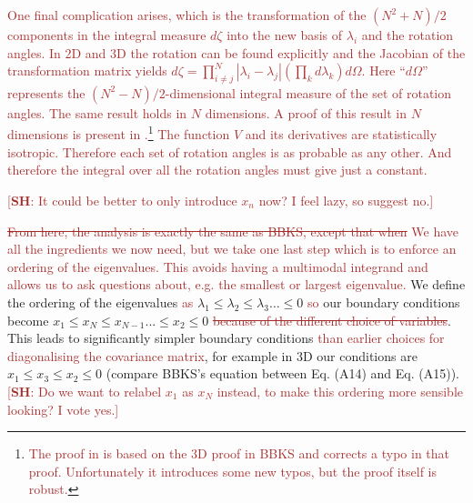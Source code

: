 \documentclass[12pt]{article}
\newcommand{\SH}[1]{\textcolor{brown}{[{\bf SH}: #1]}}
\newcommand{\sh}[1]{\textcolor{brown}{#1}}
\begin{document}
\sh{One final complication arises, which is the transformation of the $(N^2+N)/2$ components in the integral measure $d\zeta$ into the new basis of $\lambda_i$ and the rotation angles. In 2D and 3D the rotation can be found explicitly and the Jacobian of the transformation matrix yields $d \zeta = \prod_{i \neq j}^N |\lambda_i - \lambda_j|(\prod_k d\lambda_k) d \Omega$. Here ``$d\Omega$'' represents the $(N^2-N)/2$-dimensional integral measure of the set of rotation angles. The same result holds in $N$ dimensions. A proof of this result in $N$ dimensions is present in \cite{Easther2016}.\footnote{\sh{The proof in \cite{Easther2016} is based on the 3D proof in BBKS and corrects a typo in that proof. Unfortunately it introduces some new typos, but the proof itself is robust.}} The function $V$ and its derivatives are statistically isotropic. Therefore each set of rotation angles is as probable as any other. And therefore the integral over all the rotation angles must give just a constant.}





\SH{It could be better to only introduce $x_n$ now? I feel lazy, so suggest no.}

\sh{\sout{From here, the analysis is exactly the same as BBKS, except that when} We have all the ingredients we now need, but we take one last step which is to enforce an ordering of the eigenvalues. This avoids having a multimodal integrand and allows us to ask questions about, e.g. the smallest or largest eigenvalue.} We define the ordering of the eigenvalues \sh{as} $\lambda_1 \leq \lambda_2 \leq \lambda_3 \ldots \leq 0$ \sh{so} our boundary conditions become $x_1\leq x_N\leq x_{N-1} ... \leq x_2 \leq 0$ \sh{\sout{because of the different choice of \sh{variables}}}. This leads to significantly simpler boundary conditions \sh{than earlier choices for diagonalising the covariance matrix}, for example in 3D our conditions are $x_1\leq x_3 \leq x_2 \leq 0$ (compare BBKS's equation between Eq. (A14) and Eq. (A15)).\SH{Do we want to relabel $x_1$ as $x_N$ instead, to make this ordering more sensible looking? I vote yes.}
\end{document}
